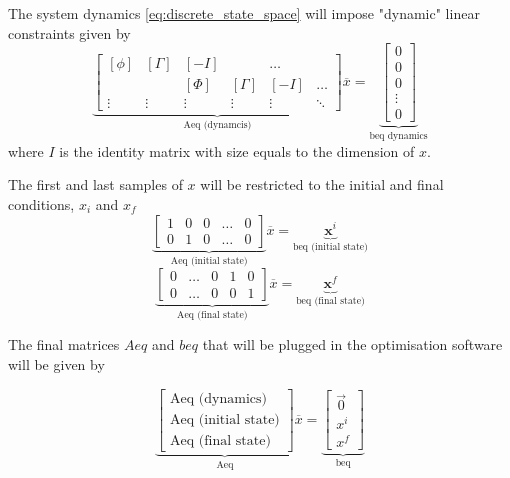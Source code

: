 \par The system dynamics \ref{eq:discrete_state_space} will impose "dynamic" linear constraints given by
\begin{equation}
    \label{eq:quad_prog_Aeq_dyn}
    \underbrace{\begin{bmatrix}
        [\phi] & \left[\Gamma\right] & \left[ -I \right] & & \ldots \\
        & & [\Phi] & [\Gamma] & \left[ -I \right] & \ldots \\
        \vdots & \vdots & \vdots & \vdots & \vdots & \ddots 
    \end{bmatrix}}_\text{Aeq (dynamcis)}
    \overline{x} = \underbrace{\begin{bmatrix} 0 \\ 0 \\ 0 \\ \vdots \\ 0 \end{bmatrix}}_\text{beq dynamics}
\end{equation}
where $I$ is the identity matrix with size equals to the dimension of $x$.

\par The first and last samples of $x$ will be restricted to the initial and final conditions, $x_i$ and $x_f$
\begin{equation}
    \label{eq:quad_prog_Aeq_init}
    \underbrace{\begin{bmatrix} 
        1 & 0 & 0 & \ldots & 0 \\
        0 & 1 & 0 & \ldots & 0 
    \end{bmatrix}}_\text{Aeq (initial state)}
    \overline{x} = \underbrace{\mathbf{x}^i}_\text{beq (initial state)}
\end{equation}
\begin{equation}
    \label{eq:quad_prog_Aeq_final}
    \underbrace{\begin{bmatrix} 
        0 & \ldots & 0 & 1 & 0 \\
        0 & \ldots & 0 & 0 & 1 
    \end{bmatrix}}_\text{Aeq (final state)}
    \overline{x} = \underbrace{\mathbf{x}^f}_\text{beq (final state)}
\end{equation}

\par The final matrices $Aeq$ and $beq$ that will be plugged in the optimisation software will be given by

\begin{equation}
    \label{eq:quad_prog_Aeq_total}
    \underbrace{\begin{bmatrix}
        \text{Aeq (dynamics)} \\ \text{Aeq (initial state)} \\ \text{Aeq (final state)}
        \end{bmatrix}}_\text{Aeq}
    \overline{x} =
    \underbrace{\begin{bmatrix}
        \vec{0} \\ x^i \\ x^f
        \end{bmatrix}}_\text{beq}
\end{equation}

